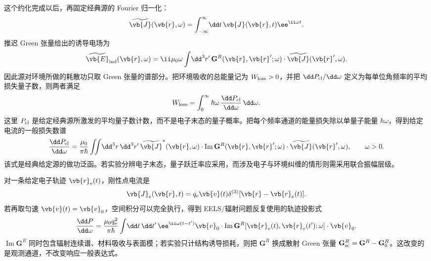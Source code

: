 这个约化完成以后，再固定经典源的 Fourier 归一化：
\begin{equation*}
\widetilde{\vb{J}}(\vb{r},\omega)
=\int_{-\infty}^{\infty}\!\dd t\,
\vb{J}(\vb{r},t)\ee^{\ii\omega t}.
\end{equation*}
推迟 Green 张量给出的诱导电场为
\begin{equation*}
\widetilde{\vb{E}}_{\rm ind}(\vb{r},\omega)
=\ii\mu_0\omega\int\!\dd^3 r'\,
\mathbf G^R(\vb{r},\vb{r}';\omega)\cdot\widetilde{\vb{J}}(\vb{r}',\omega).
\end{equation*}
因此源对环境所做的耗散功只取 Green 张量的谱部分。把环境吸收的总能量记为 $W_{\rm loss}>0$，并把 $\dd P_{\rm cl}/\dd\omega$ 定义为每单位角频率的平均损失量子数，则两者满足
\begin{equation*}
W_{\rm loss}
=\int_0^\infty\hbar\omega\,
\frac{\dd P_{\rm cl}}{\dd\omega}\,\dd\omega.
\end{equation*}
这里 $P_{\rm cl}$ 是给定经典源所激发的平均量子数计数，而不是电子末态的量子概率。把每个频率通道的能量损失除以单量子能量 $\hbar\omega$，得到给定电流的一般损失数谱
\begin{equation}
{
\frac{\dd P_{\rm cl}}{\dd\omega}
=\frac{\mu_0}{\pi\hbar}
\iint\!\dd^3 r\,\dd^3 r'\,
\widetilde{\vb{J}}^{*}(\vb{r},\omega)\cdot
\operatorname{Im}\mathbf G^R(\vb{r},\vb{r}';\omega)\cdot
\widetilde{\vb{J}}(\vb{r}',\omega),
\qquad \omega>0.}
\label{eq:prescribed_current_green_loss_master}
\end{equation}
该式是经典给定源的做功泛函。若实验分辨电子末态，量子跃迁率应采用，而涉及电子与环境纠缠的情形则需采用联合振幅层级。

对一条给定电子轨迹 $\vb{r}_e(t)$，刚性点电流是
\begin{equation*}
\vb{J}_e(\vb{r},t)=q_{\mathrm e}\vb{v}(t)\delta^{(3)}[\vb{r}-\vb{r}_e(t)].
\end{equation*}
若再取匀速 $\vb{v}(t)=\vb{v}_0$，空间积分可以完全执行，得到 EELS/辐射问题反复使用的轨迹投影式
\begin{equation}
{
\frac{\dd P}{\dd\omega}
=\frac{\mu_0q_{\mathrm e}^2}{\pi\hbar}
\int\!\dd t\,\dd t'\,
\ee^{\ii\omega(t-t')}
\vb{v}_0\cdot
\operatorname{Im}\mathbf G^R[\vb{r}_e(t),\vb{r}_e(t');\omega]
\cdot\vb{v}_0.}
\label{eq:green_tensor_eels_master}
\end{equation}
$\operatorname{Im}\mathbf G^R$ 同时包含辐射连续谱、材料吸收与表面模；若实验只计结构诱导损耗，则把 $\mathbf G^R$ 换成散射 Green 张量 $\mathbf G_{\rm sc}^R=\mathbf G^R-\mathbf G_0^R$。这改变的是观测通道，不改变响应一般表达式。\cite{RiveraKaminer2020Quasiparticles,GarciaDeAbajoDiGiulio2021}

